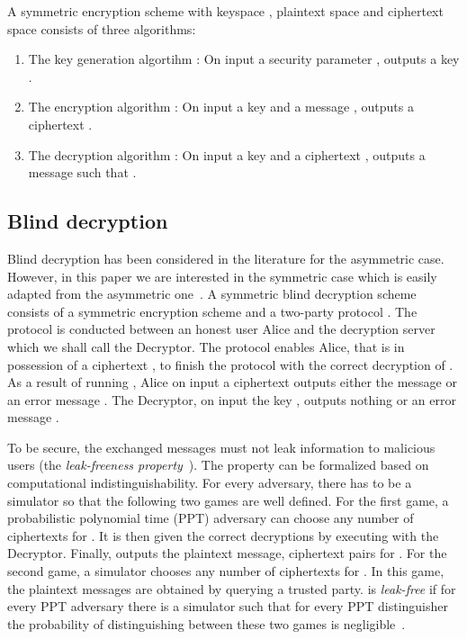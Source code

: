 \documentclass[10pt,journal]{IEEEtran}
\begin{document}
A symmetric encryption scheme 
with keyspace , plaintext space  and ciphertext space 
consists of three algorithms:
\begin{enumerate}
	\item The key generation algortihm : On input a security parameter ,  outputs a key .
	\item The encryption algorithm : On input a key  and a message ,  outputs a ciphertext .
	\item The decryption algorithm : On input a key  and a ciphertext ,  outputs a message 
	such that .
\end{enumerate}




\subsection{Blind decryption}
\label{sec:Blind decryption}

Blind decryption has been considered in the literature for the asymmetric case.
However, in this paper we are interested in the symmetric case which is
easily adapted from the asymmetric one~\cite{Green_2011}.
A symmetric blind decryption scheme 
consists of a symmetric
encryption scheme 
and a two-party protocol .
The protocol  is conducted between an honest user Alice and the decryption server which we shall call the Decryptor. The protocol
enables Alice, that is in possession of a ciphertext , to finish the protocol
with the correct decryption of .	
	As a result of running , Alice on input a ciphertext 
	outputs either the message  or an error message .
  The Decryptor, on input the key , outputs nothing or an error message .


 To be secure,
the exchanged messages
must not leak information to malicious users (the \emph{leak-freeness property}~\cite{Green_2007}).
The property can be formalized based on computational indistinguishability.
For every adversary, there has to be a simulator so that the following two games are well defined.
For the first game, a probabilistic polynomial time (PPT) adversary  can choose any number  of ciphertexts  for .
It is then given the correct decryptions by executing  with the Decryptor. Finally,
 outputs the plaintext message, ciphertext pairs  for .
For the second game,
a simulator  chooses any number  of ciphertexts  for .
In this game, the plaintext messages are obtained by querying a trusted party.
 is \emph{leak-free} if for every PPT adversary  there is a simulator 
such that for every PPT distinguisher  the probability of distinguishing between
these two games is negligible~\cite{Green_2011}.
\end{document}
